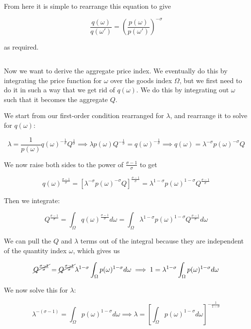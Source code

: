 \documentclass[12pt, letterpaper]{article}
\begin{document}
	From here it is simple to rearrange this equation to give

	\[ \frac{q(\omega)}{q(\omega')} = \left(\frac{p(\omega)}{p(\omega')}\right)^{-\sigma}    \] 

	as required.

    \subsection{}

    Now we want to derive the aggregate price index. We eventually do this by integrating the price function for \(\omega\) over the goods index \(\Omega\), but we first need to do it in such a way that we get rid of \(q(\omega)\). We do this by integrating out \(\omega\) such that it becomes the aggregate \(Q\). 
	
	We start from our first-order condition rearranged for \(\lambda\), and rearrange it to solve for \(q(\omega)\):

	\[ \lambda = \frac{1}{p(\omega)} q(\omega)^{-\frac{1}{\sigma}} Q^{\frac{1}{\sigma}} \implies \lambda p(\omega) Q^{-\frac{1}{\sigma}} = q(\omega)^{-\frac{1}{\sigma}}  \implies q(\omega) = \lambda^{-\sigma} p(\omega)^{-\sigma} Q    \]
	
	We now raise both sides to the power of \( \frac{\sigma - 1}{\sigma} \) to get 

	\[ q(\omega)^{\frac{\sigma - 1}{\sigma}} = \left[\lambda^{-\sigma} p(\omega)^{-\sigma} Q\right]^{\frac{\sigma - 1}{\sigma}} = \lambda^{1 - \sigma} p(\omega)^{1 - \sigma} Q^{\frac{\sigma - 1}{\sigma}} \]

	Then we integrate:

	\[ Q^{\frac{\sigma - 1}{\sigma}} = \int_{\Omega} q(\omega)^{\frac{\sigma - 1}{\sigma}} d\omega = \int_{\Omega} \lambda^{1 - \sigma} p(\omega)^{1 - \sigma} Q^{\frac{\sigma - 1}{\sigma}}  d\omega    \]

	We can pull the \(Q\) and \(\lambda\) terms out of the integral because they are independent of the quantity index \(\omega\), which gives us

	\[ \cancel{Q^{\frac{\sigma - 1}{\sigma}}} = \cancel{Q^{\frac{\sigma - 1}{\sigma}}} \lambda^{1 - \sigma} \int_{\Omega} p(\omega)^{1 - \sigma} d\omega \implies 1 =  \lambda^{1 - \sigma} \int_{\Omega} p(\omega)^{1 - \sigma} d\omega     \]

	We now solve this for \(\lambda\):

	\[ \lambda^{- (\sigma - 1)} = \int_{\Omega} p(\omega)^{1 - \sigma} d\omega \implies \lambda = \left[ \int_{\Omega} p(\omega)^{1 - \sigma} d\omega \right]^{- \frac{1}{1 - \sigma}}  \]
\end{document}
